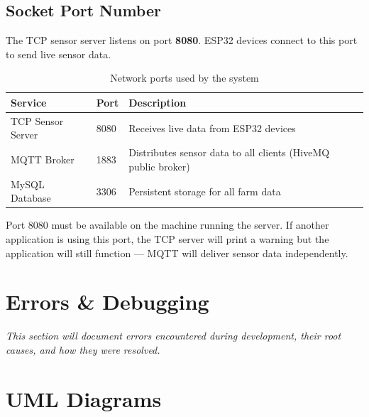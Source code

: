 \documentclass[12pt, a4paper]{report}
\begin{document}
\section{Socket Port Number}\label{sec:socket}

The TCP sensor server listens on port \textbf{8080}. ESP32 devices connect to this port to send live sensor data.

\begin{table}[H]
\centering
\renewcommand{\arraystretch}{1.5}
\begin{tabularx}{\textwidth}{l l X}
\toprule
\textbf{Service} & \textbf{Port} & \textbf{Description} \\
\midrule
TCP Sensor Server & 8080 & Receives live data from ESP32 devices \\
MQTT Broker       & 1883 & Distributes sensor data to all clients (HiveMQ public broker) \\
MySQL Database    & 3306 & Persistent storage for all farm data \\
\bottomrule
\end{tabularx}
\caption{Network ports used by the system}
\end{table}

\begin{tcolorbox}[warnbox, title={Important}]
Port 8080 must be available on the machine running the server. If another application is using this port, the TCP server will print a warning but the application will still function --- MQTT will deliver sensor data independently.
\end{tcolorbox}


\chapter{Errors \& Debugging}


\textit{This section will document errors encountered during development, their root causes, and how they were resolved.}


\chapter{UML Diagrams}
\end{document}
